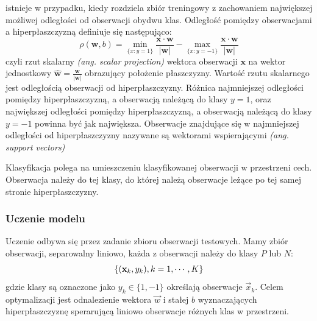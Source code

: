 \documentclass[a4paper,12pt,twoside,openany]{report}
\newcommand{\ang}[1]{\textit{(ang. #1)}}
\begin{document}
\begin{enumerate}
istnieje w przypadku, kiedy rozdziela zbiór treningowy z zachowaniem największej możliwej odległości od obserwacji obydwu klas.
Odległość pomiędzy obserwacjami a hiperpłaszczyzną definiuje się następująco:
\begin{equation}
	\rho(\bm{w}, b) = \min\limits_{\{x:y=1\}} \frac{\bm{x} \cdot \bm{w}} {|\bm{w}|} - \max\limits_{\{x:y=-1\}}  \frac{\bm{x} \cdot \bm{w}} {|\bm{w}|} 
\end{equation}
czyli rzut skalarny \ang{scalar projection} wektora obserwacji $\bm{x}$ na wektor jednostkowy $\hat{\bm{w}} = \frac{\bm{w}}{|\bm{w}|}$
obrazujący położenie płaszczyzny.
Wartość rzutu skalarnego jest odległością obserwacji od hiperpłaszczyzny. 
Różnica najmniejszej odległości pomiędzy hiperpłaszczyzną, a obserwacją należącą do klasy $y=1$,
oraz największej odległości pomiędzy hiperpłaszczyzną, a obserwacją należącą do klasy $y=-1$ 
powinna być jak największa.
Obserwacje znajdujące się w najmniejszej odległości od hiperpłaszczyzny nazywane są wektorami wspierającymi \ang{support vectors}

Klasyfikacja polega na umieszczeniu klasyfikowanej obserwacji w przestrzeni cech.
Obserwacja należy do tej klasy, do której należą obserwacje leżące po tej samej stronie hiperpłaszczyzny.
\subsubsection{Uczenie modelu}
Uczenie odbywa się przez zadanie zbioru obserwacji testowych. 
Mamy zbiór obserwacji, separowalny liniowo, każda z obserwacji należy do klasy $P$ lub $N$:
\begin{displaymath}
	\{ ({\bf x}_k, y_k), k=1,\cdots,K \} 
\end{displaymath}
gdzie klasy są oznaczone jako $y_k \in \{1,-1\}$ określają obserwacje $\vec{x}_k$.
Celem optymalizacji jest odnalezienie wektora $\vec{w}$ i stałej $b$ wyznaczających hiperpłaszczyznę
sperarującą liniowo obserwacje różnych klas w przestrzeni. 


\end{enumerate}
\end{document}
